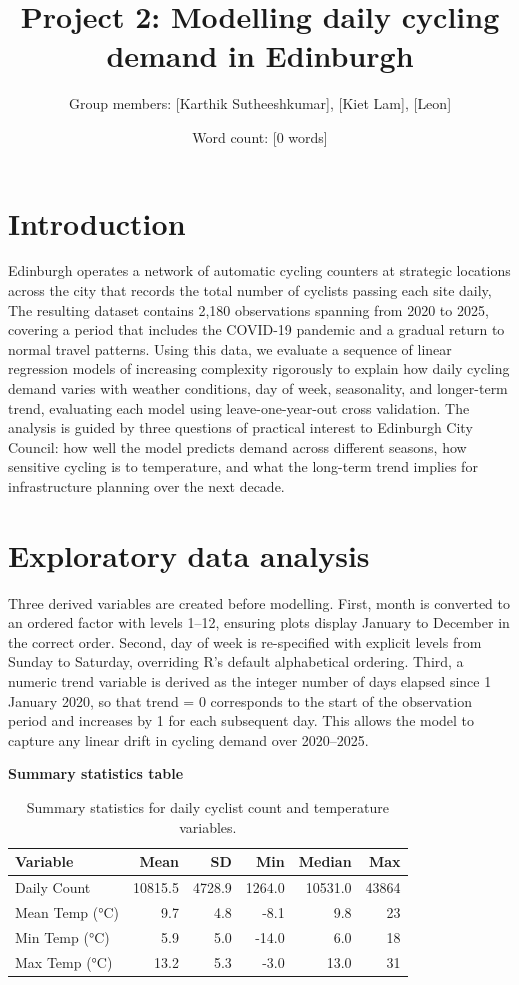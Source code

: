 \documentclass[
]{article}
\title{Project 2: Modelling daily cycling demand in Edinburgh}
\author{Group members: {[}Karthik Sutheeshkumar{]}, {[}Kiet Lam{]},
{[}Leon{]}}
\date{Word count: {[}0 words{]}}
\begin{document}
\maketitle

\section{Introduction}\label{introduction}

Edinburgh operates a network of automatic cycling counters at strategic
locations across the city that records the total number of cyclists
passing each site daily, The resulting dataset contains 2,180
observations spanning from 2020 to 2025, covering a period that includes
the COVID-19 pandemic and a gradual return to normal travel patterns.
Using this data, we evaluate a sequence of linear regression models of
increasing complexity rigorously to explain how daily cycling demand
varies with weather conditions, day of week, seasonality, and
longer-term trend, evaluating each model using leave-one-year-out cross
validation. The analysis is guided by three questions of practical
interest to Edinburgh City Council: how well the model predicts demand
across different seasons, how sensitive cycling is to temperature, and
what the long-term trend implies for infrastructure planning over the
next decade.

\section{Exploratory data analysis}\label{exploratory-data-analysis}

Three derived variables are created before modelling. First, month is
converted to an ordered factor with levels 1--12, ensuring plots display
January to December in the correct order. Second, day of week is
re-specified with explicit levels from Sunday to Saturday, overriding
R's default alphabetical ordering. Third, a numeric trend variable is
derived as the integer number of days elapsed since 1 January 2020, so
that trend = 0 corresponds to the start of the observation period and
increases by 1 for each subsequent day. This allows the model to capture
any linear drift in cycling demand over 2020--2025.

\textbf{Summary statistics table}

\begin{table}

\caption{\label{tab:unnamed-chunk-1}Summary statistics for daily cyclist count and temperature variables.}
\centering
\begin{tabular}[t]{lrrrrr}
\toprule
Variable & Mean & SD & Min & Median & Max\\
\midrule
Daily Count & 10815.5 & 4728.9 & 1264.0 & 10531.0 & 43864\\
Mean Temp (°C) & 9.7 & 4.8 & -8.1 & 9.8 & 23\\
Min Temp (°C) & 5.9 & 5.0 & -14.0 & 6.0 & 18\\
Max Temp (°C) & 13.2 & 5.3 & -3.0 & 13.0 & 31\\
\bottomrule
\end{tabular}
\end{table}
\end{document}
